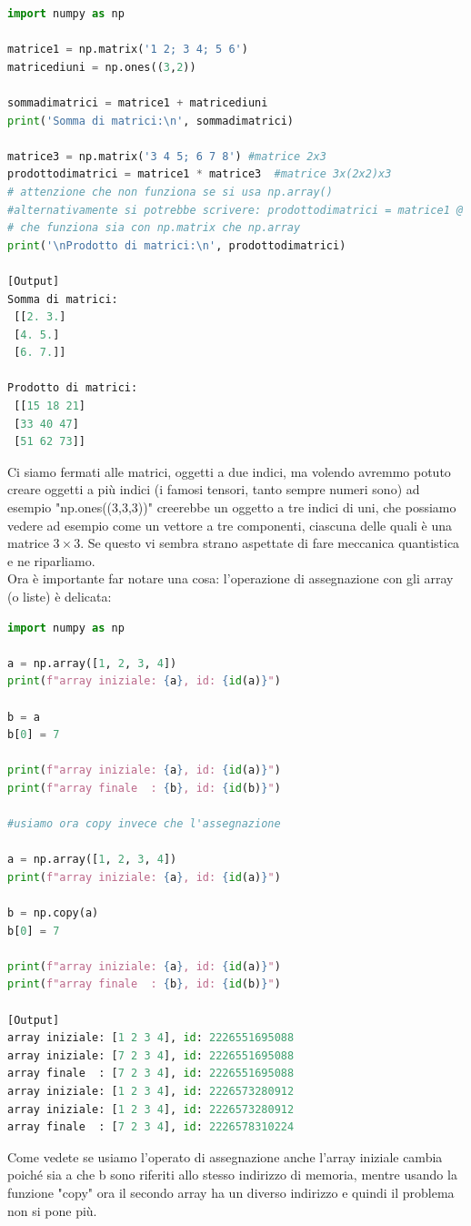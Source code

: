 \documentclass[10pt,a4paper]{article}
\begin{document}
\begin{lstlisting}[language=Python]
import numpy as np

matrice1 = np.matrix('1 2; 3 4; 5 6')
matricediuni = np.ones((3,2))

sommadimatrici = matrice1 + matricediuni
print('Somma di matrici:\n', sommadimatrici)

matrice3 = np.matrix('3 4 5; 6 7 8') #matrice 2x3
prodottodimatrici = matrice1 * matrice3  #matrice 3x(2x2)x3
# attenzione che non funziona se si usa np.array()
#alternativamente si potrebbe scrivere: prodottodimatrici = matrice1 @ matrice3
# che funziona sia con np.matrix che np.array
print('\nProdotto di matrici:\n', prodottodimatrici)

[Output]
Somma di matrici:
 [[2. 3.]
 [4. 5.]
 [6. 7.]]

Prodotto di matrici:
 [[15 18 21]
 [33 40 47]
 [51 62 73]]
\end{lstlisting}
Ci siamo fermati alle matrici, oggetti a due indici, ma volendo avremmo potuto creare oggetti a più indici (i famosi tensori, tanto sempre numeri sono) ad esempio "np.ones((3,3,3))" creerebbe un oggetto a tre indici di uni, che possiamo vedere ad esempio come un vettore a tre componenti, ciascuna delle quali è una matrice $3\times3$. Se questo vi sembra strano aspettate di fare meccanica quantistica e ne riparliamo.\\
Ora è importante far notare una cosa: l'operazione di assegnazione con gli array (o liste) è delicata:
\begin{lstlisting}[language=Python]
import numpy as np

a = np.array([1, 2, 3, 4])
print(f"array iniziale: {a}, id: {id(a)}")

b = a
b[0] = 7

print(f"array iniziale: {a}, id: {id(a)}")
print(f"array finale  : {b}, id: {id(b)}")

#usiamo ora copy invece che l'assegnazione

a = np.array([1, 2, 3, 4])
print(f"array iniziale: {a}, id: {id(a)}")

b = np.copy(a)
b[0] = 7

print(f"array iniziale: {a}, id: {id(a)}")
print(f"array finale  : {b}, id: {id(b)}")

[Output]
array iniziale: [1 2 3 4], id: 2226551695088
array iniziale: [7 2 3 4], id: 2226551695088
array finale  : [7 2 3 4], id: 2226551695088
array iniziale: [1 2 3 4], id: 2226573280912
array iniziale: [1 2 3 4], id: 2226573280912
array finale  : [7 2 3 4], id: 2226578310224
\end{lstlisting}
Come vedete se usiamo l'operato di assegnazione anche l'array iniziale cambia poiché sia a che b sono riferiti allo stesso indirizzo di memoria, mentre usando la funzione "copy" ora il secondo array ha un diverso indirizzo e quindi il problema non si pone più.
\end{document}
